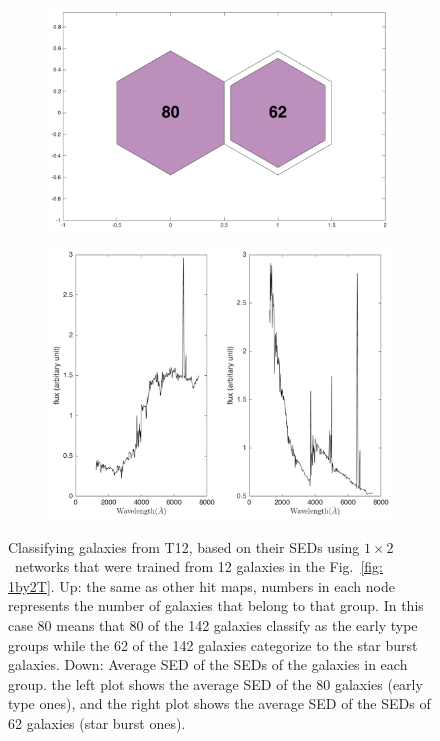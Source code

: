             \begin{figure}
                \begin{subfigure}[b]{0.5\textwidth}
                    \centering
                    \includegraphics[width=\textwidth]{../images0.01/1d/hit_v_1_by_2.png}
                \end{subfigure}
                \hfill
                \begin{subfigure}[b]{0.5\textwidth}
                     \includegraphics[width=\textwidth]{../images/1d/SED_total1by2.png}
                \end{subfigure}
                \caption{Classifying galaxies from T12, based on their SEDs using $1\times2$~networks that were trained from 12 galaxies in the Fig.~\ref{fig: 1by2T}. Up: the same as other hit maps, numbers in each node represents the number of galaxies that belong to that group. In this case 80 means that 80 of the 142 galaxies classify as the early type groups while the 62 of the 142 galaxies categorize to the star burst galaxies. Down: Average SED of the SEDs of the galaxies in each group. the left plot shows the average SED of the 80 galaxies (early type ones), and the right plot shows the average SED of the SEDs of 62 galaxies (star burst ones).}
                \label{fig: 1by2V}
            \end{figure}            
